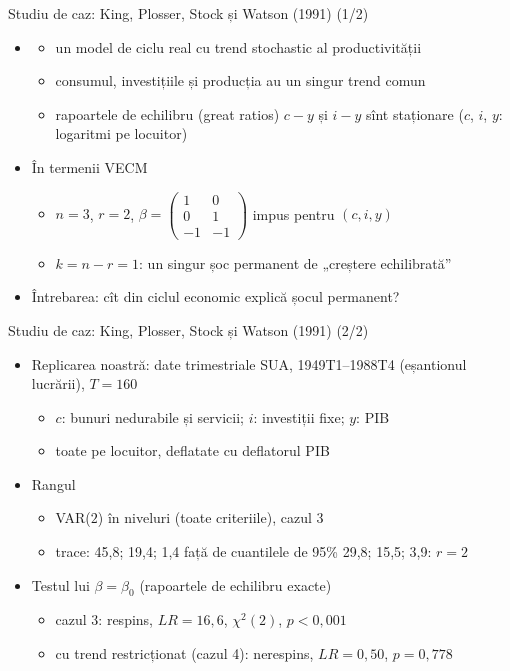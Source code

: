 \begin{frame}{Studiu de caz: King, Plosser, Stock și Watson (1991) (1/2)}
\itemsize{\small}
\begin{itemize}
    \item {}
    \begin{itemize}
        \item un model de ciclu real cu trend stochastic al productivității
        \item consumul, investițiile și producția au un singur trend comun
        \item rapoartele de echilibru (great ratios) $c - y$ și $i - y$ sînt staționare ($c$, $i$, $y$: logaritmi pe locuitor)
    \end{itemize}
    \item În termenii VECM
    \begin{itemize}
        \item $n = 3$, $r = 2$, $\beta = \begin{pmatrix}1 & 0\\ 0 & 1\\ -1 & -1\end{pmatrix}$ impus pentru $(c, i, y)$
        \item $k = n - r = 1$: un singur șoc permanent de „creștere echilibrată”
    \end{itemize}
    \item Întrebarea: cît din ciclul economic explică șocul permanent?
\end{itemize}
\end{frame}

\begin{frame}{Studiu de caz: King, Plosser, Stock și Watson (1991) (2/2)}
\itemsize{\small}
\begin{itemize}
    \item Replicarea noastră: date trimestriale SUA, 1949T1--1988T4 (eșantionul lucrării), $T = 160$
    \begin{itemize}
        \item $c$: bunuri nedurabile și servicii; $i$: investiții fixe; $y$: PIB
        \item toate pe locuitor, deflatate cu deflatorul PIB
    \end{itemize}
    \item Rangul
    \begin{itemize}
        \item VAR($2$) în niveluri (toate criteriile), cazul 3
        \item trace: 45{,}8; 19{,}4; 1{,}4 față de cuantilele de 95\% 29{,}8; 15{,}5; 3{,}9: $r = 2$
    \end{itemize}
    \item Testul lui $\beta = \beta_0$ (rapoartele de echilibru exacte)
    \begin{itemize}
        \item cazul 3: respins, $LR = 16{,}6$, $\chi^2(2)$, $p < 0{,}001$
        \item cu trend restricționat (cazul 4): nerespins, $LR = 0{,}50$, $p = 0{,}778$
    \end{itemize}
\end{itemize}
\end{frame}

